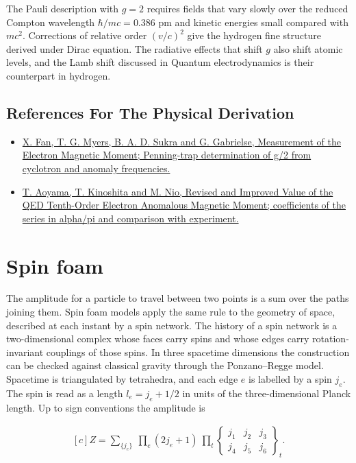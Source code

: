 \documentclass[11pt,oneside]{book}
\newenvironment{centeredalign}{\[\begin{gathered}[c]}{\end{gathered}\]}
\begin{document}
The Pauli description with \(g=2\) requires fields that vary slowly over the reduced Compton wavelength \(\hbar/mc=0.386\) pm and kinetic energies small compared with \(mc^2\). Corrections of relative order \((v/c)^2\) give the hydrogen fine structure derived under Dirac equation. The radiative effects that shift \(g\) also shift atomic levels, and the Lamb shift discussed in Quantum electrodynamics is their counterpart in hydrogen.

\subsection*{References For The Physical Derivation}
\begin{itemize}
\item \href{https://arxiv.org/abs/2209.13084}{X. Fan, T. G. Myers, B. A. D. Sukra and G. Gabrielse, Measurement of the Electron Magnetic Moment; Penning-trap determination of g/2 from cyclotron and anomaly frequencies.}
\item \href{https://arxiv.org/abs/1712.06060}{T. Aoyama, T. Kinoshita and M. Nio, Revised and Improved Value of the QED Tenth-Order Electron Anomalous Magnetic Moment; coefficients of the series in alpha/pi and comparison with experiment.}
\end{itemize}





\clearpage

\section{Spin foam}

\label{topic:spin-foam}

The amplitude for a particle to travel between two points is a sum over the paths joining them. Spin foam models apply the same rule to the geometry of space, described at each instant by a spin network. The history of a spin network is a two-dimensional complex whose faces carry spins and whose edges carry rotation-invariant couplings of those spins. In three spacetime dimensions the construction can be checked against classical gravity through the Ponzano--Regge model. Spacetime is triangulated by tetrahedra, and each edge \(e\) is labelled by a spin \(j_e\). The spin is read as a length \(l_e=j_e+1/2\) in units of the three-dimensional Planck length. Up to sign conventions the amplitude is

\begin{centeredalign}
Z=\sum_{\{j_e\}}\ \prod_e(2j_e+1)\ \prod_t\begin{Bmatrix}j_1&j_2&j_3\\ j_4&j_5&j_6\end{Bmatrix}_t .
\end{centeredalign}
\end{document}

